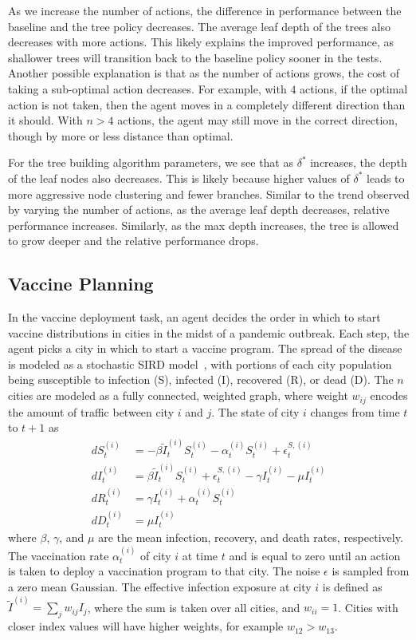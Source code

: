 \documentclass[letterpaper]{article} %
\begin{document}
As we increase the number of actions, the difference in performance between the baseline and the tree policy decreases.
The average leaf depth of the trees also decreases with more actions.
This likely explains the improved performance, as shallower trees will transition back to the baseline policy sooner in the tests.
Another possible explanation is that as the number of actions grows, the cost of taking a sub-optimal action decreases.
For example, with $4$ actions, if the optimal action is not taken, then the agent moves in a completely different direction than it should.
With $n>4$ actions, the agent may still move in the correct direction, though by more or less distance than optimal.

For the tree building algorithm parameters, we see that as $\delta^*$ increases, the depth of the leaf nodes also decreases.
This is likely because higher values of $\delta^*$ leads to more aggressive node clustering and fewer branches.
Similar to the trend observed by varying the number of actions, as the average leaf depth decreases, relative performance increases.
Similarly, as the max depth increases, the tree is allowed to grow deeper and the relative performance drops.

\subsection{Vaccine Planning}
In the vaccine deployment task, an agent decides the order in which to start vaccine distributions in cities in the midst of a pandemic outbreak.
Each step, the agent picks a city in which to start a vaccine program.
The spread of the disease is modeled as a stochastic SIRD model~\cite{bailey1975}, with portions of each city population being susceptible to infection (S), infected (I), recovered (R), or dead (D).
The $n$ cities are modeled as a fully connected, weighted graph, where weight $w_{ij}$ encodes the amount of traffic between city $i$ and $j$.
The state of city $i$ changes from time $t$ to $t+1$ as
\begin{align}
dS^{(i)}_{t} &= -\beta \tilde{I}^{(i)}_t S^{(i)}_t - \alpha^{(i)}_t S^{(i)}_t +\epsilon^{S, (i)}_t \\
dI^{(i)}_{t} &= \beta \tilde{I}^{(i)}_t S^{(i)}_t +\epsilon^{S, (i)}_t - \gamma I^{(i)}_t - \mu I^{(i)}_t \\
dR^{(i)}_{t} &= \gamma I^{(i)}_t + \alpha^{(i)}_t S^{(i)}_t \\
dD^{(i)}_{t} &= \mu I^{(i)}_t
\end{align}
where $\beta$, $\gamma$, and $\mu$ are the mean infection, recovery, and death rates, respectively.
The vaccination rate $\alpha^{(i)}_{t}$ of city $i$ at time $t$ and is equal to zero until an action is taken to deploy a vaccination program to that city.
The noise $\epsilon$ is sampled from a zero mean Gaussian.
The effective infection exposure at city $i$ is defined as $\tilde{I}^{(i)} = \sum_j w_{ij}I_j$, where the sum is taken over all cities, and $w_{ii} = 1$.
Cities with closer index values will have higher weights, for example $w_{12} > w_{13}$.
\end{document}
